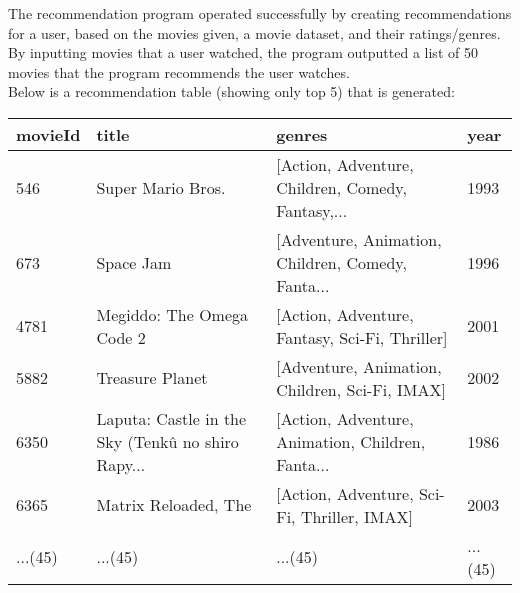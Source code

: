 \documentclass{article}
\begin{document}
The recommendation program operated successfully by creating recommendations for a user, based on the movies 
given, a movie dataset, and their ratings/genres. By inputting movies that a user watched, the program outputted
a list of 50 movies that the program recommends the user watches.\\
Below is a recommendation table (showing only top 5) that is generated: 
\begin{center}
    \begin{tabular}{| m{1cm} | m{2cm}| m{5cm} | m{5em} |}
        \hline
        movieId & title & genres & year \\ [0.5ex] 
        \hline\hline
        546 & Super Mario Bros. & [Action, Adventure, Children, Comedy, Fantasy,... & 1993 \\ 
        \hline
        673 & Space Jam & [Adventure, Animation, Children, Comedy, Fanta... & 1996 \\ 
        \hline
        4781 & Megiddo: The Omega Code 2 & [Action, Adventure, Fantasy, Sci-Fi, Thriller] & 2001 \\ 
        \hline
        5882 & Treasure Planet & [Adventure, Animation, Children, Sci-Fi, IMAX] & 2002 \\ 
        \hline
        6350 & Laputa: Castle in the Sky (Tenkû no shiro Rapy... & [Action, Adventure, Animation, Children, Fanta... & 1986 \\ 
        \hline
        6365 & Matrix Reloaded, The & [Action, Adventure, Sci-Fi, Thriller, IMAX] & 2003 \\  
        \hline
        ...(45) & ...(45) & ...(45) & ...(45) \\ [1ex]
        \hline
    \end{tabular}
    \end{center}
\end{document}
